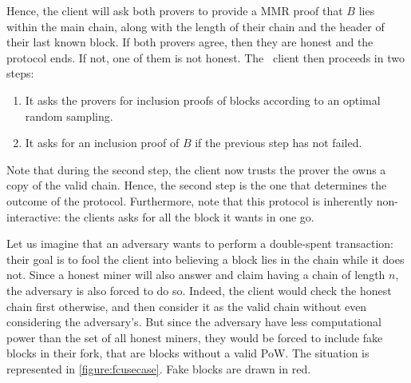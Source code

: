           Hence, the client will ask both provers to provide a MMR proof that \(B\) lies within the main chain, along with the length of their chain and the header of their last known block. If both provers agree, then they are honest and the protocol ends. If not, one of them is not honest. The \FC\ client then proceeds in two steps:
          
          \begin{enumerate}
            \item It asks the provers for inclusion proofs of blocks according to an optimal random sampling.
            \item It asks for an inclusion proof of \(B\) if the previous step has not failed.
          \end{enumerate}
          
          Note that during the second step, the client now trusts the prover the owns a copy of the valid chain. Hence, the second step is the one that determines the outcome of the protocol. Furthermore, note that this protocol is inherently non-interactive: the clients asks for all the block it wants in one go.
          
          Let us imagine that an adversary wants to perform a double-spent transaction: their goal is to fool the client into believing a block lies in the chain while it does not. Since a honest miner will also answer and claim having a chain of length \(n\), the adversary is also forced to do so. Indeed, the client would check the honest chain first otherwise, and then consider it as the valid chain without even considering the adversary's. But since the adversary have less computational power than the set of all honest miners, they would be forced to include fake blocks in their fork, that are blocks without a valid PoW. The situation  is represented in \autoref{figure:fcusecase}. Fake blocks are drawn in red.
          
